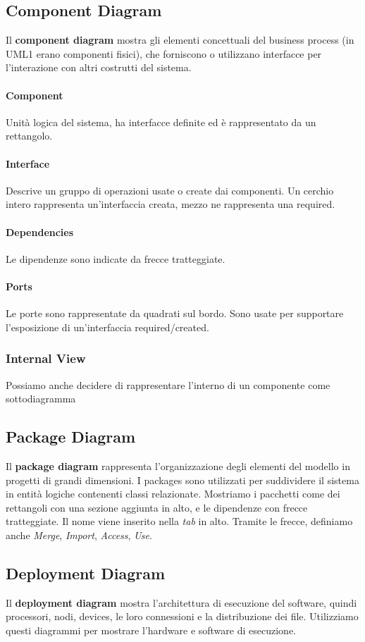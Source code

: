 \documentclass[11pt]{article}
\begin{document}
\subsection{Component Diagram}
Il \textbf{component diagram} mostra gli elementi concettuali del business process (in UML1 erano componenti fisici), che forniscono o utilizzano interfacce per l'interazione con altri costrutti del sistema.
\paragraph{Component} Unità logica del sistema, ha interfacce definite ed è rappresentato da un rettangolo.
\paragraph{Interface} Descrive un gruppo di operazioni usate o create dai componenti. Un cerchio intero rappresenta un'interfaccia creata, mezzo ne rappresenta una required.
\paragraph{Dependencies} Le dipendenze sono indicate da frecce tratteggiate.
\paragraph{Ports} Le porte sono rappresentate da quadrati sul bordo. Sono usate per supportare l'esposizione di un'interfaccia required/created.
\subsubsection{Internal View}
Possiamo anche decidere di rappresentare l'interno di un componente come sottodiagramma

\subsection{Package Diagram}
Il \textbf{package diagram} rappresenta l'organizzazione degli elementi del modello in progetti di grandi dimensioni. I packages sono utilizzati per suddividere il sistema in entità logiche contenenti classi relazionate. Mostriamo i pacchetti come dei rettangoli con una sezione aggiunta in alto, e le dipendenze con frecce tratteggiate. Il nome viene inserito nella \textit{tab} in alto. Tramite le frecce, definiamo anche \textit{Merge}, \textit{Import}, \textit{Access}, \textit{Use}.

\subsection{Deployment Diagram}
Il \textbf{deployment diagram} mostra l'architettura di esecuzione del software, quindi processori, nodi, devices, le loro connessioni e la distribuzione dei file. Utilizziamo questi diagrammi per mostrare l'hardware e software di esecuzione. 
\end{document}
